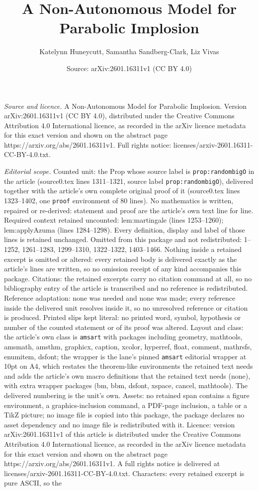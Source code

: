 \documentclass[10pt,a4paper]{amsart}
\title[A Non-Autonomous Model for Parabolic Implosion]{A Non-Autonomous Model for Parabolic Implosion}
\author{Katelynn Huneycutt, Samantha Sandberg-Clark, Liz Vivas}
\date{Source: arXiv:2601.16311v1 (CC BY 4.0)}
\begin{document}
\maketitle

\noindent\emph{Source and licence.} A Non-Autonomous Model for Parabolic Implosion. Version arXiv:2601.16311v1 (CC BY 4.0), distributed under the Creative Commons Attribution 4.0 International licence, as recorded in the arXiv licence metadata for this exact version and shown on the abstract page https://arxiv.org/abs/2601.16311v1. Full rights notice: licenses/arxiv-2601.16311-CC-BY-4.0.txt.\par\smallskip

\noindent\textit{Editorial scope.} Counted unit: the Prop whose source label is \texttt{prop:randombigO} in the article (source0.tex lines 1311--1321, source label \texttt{prop:randombigO}), delivered together with the article's own complete original proof of it (source0.tex lines 1323--1402, one \texttt{proof} environment of 80 lines). No mathematics is written, repaired or re-derived: statement and proof are the article's own text line for line. Required context retained uncounted: lem:martingale (lines 1253--1260); lem:applyAzuma (lines 1284--1298). Every definition, display and label of those lines is retained unchanged. Omitted from this package and not redistributed: 1--1252, 1261--1283, 1299--1310, 1322--1322, 1403--1466. Nothing inside a retained excerpt is omitted or altered: every retained body is delivered exactly as the article's lines are written, so no omission receipt of any kind accompanies this package. Citations: the retained excerpts carry no citation command at all, so no bibliography entry of the article is transcribed and no reference is redistributed. Reference adaptation: none was needed and none was made; every reference inside the delivered unit resolves inside it, so no unresolved reference or citation is produced. Printed slips kept literal: no printed word, symbol, hypothesis or number of the counted statement or of its proof was altered. Layout and class: the article's own class is \texttt{amsart} with packages including geometry, mathtools, amsmath, amsthm, graphicx, caption, xcolor, hyperref, float, comment, mathrsfs, enumitem, dsfont; the wrapper is the lane's pinned \texttt{amsart} editorial wrapper at 10pt on A4, which restates the theorem-like environments the retained text needs and adds the article's own macro definitions that the retained text needs (none), with extra wrapper packages (bm, bbm, dsfont, xspace, cancel, mathtools). The delivered numbering is the unit's own. Assets: no retained span contains a figure environment, a graphics-inclusion command, a PDF-page inclusion, a table or a TikZ picture; no image file is copied into this package, the package declares no asset dependency and no image file is redistributed with it. Licence: version arXiv:2601.16311v1 of this article is distributed under the Creative Commons Attribution 4.0 International licence, as recorded in the arXiv licence metadata for this exact version and shown on the abstract page https://arxiv.org/abs/2601.16311v1. A full rights notice is delivered at licenses/arxiv-2601.16311-CC-BY-4.0.txt. Characters: every retained excerpt is pure ASCII, so the 
\end{document}
